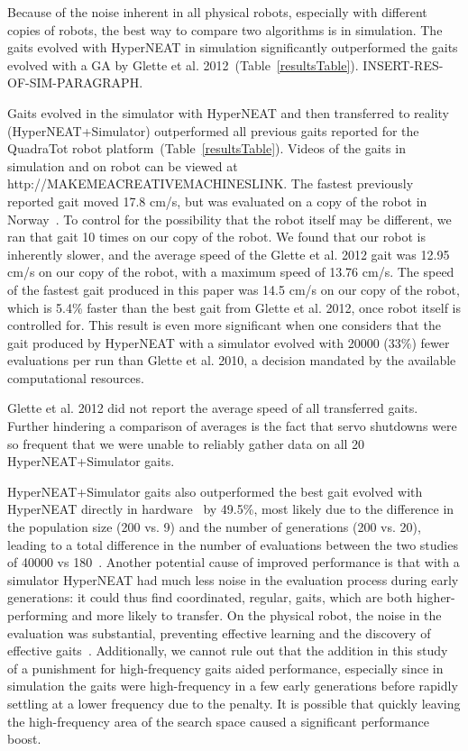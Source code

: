 Because of the noise inherent in all physical robots, especially with different copies of robots, the best way to compare two algorithms is in simulation. The gaits evolved with HyperNEAT in simulation significantly outperformed the gaits evolved with a GA by Glette et al. 2012~(Table~\ref{resultsTable}). INSERT-RES-OF-SIM-PARAGRAPH. 

Gaits evolved in the simulator with HyperNEAT and then transferred to reality (HyperNEAT+Simulator) outperformed all previous gaits reported for the QuadraTot robot platform~(Table~\ref{resultsTable}). Videos of the gaits in simulation and on robot can be viewed at http://MAKEMEACREATIVEMACHINESLINK.
The fastest previously reported gait moved 17.8 cm/s, but was evaluated on a copy of the robot in Norway~\cite{glette}. To control for the possibility that the robot itself may be different, we ran that gait 10 times on our copy of the robot. We found that our robot is inherently slower, and the average speed of the Glette et al. 2012 gait was 12.95 cm/s on our copy of the robot, with a maximum speed of 13.76 cm/s.
The speed of the fastest gait produced in this paper was 14.5 cm/s on our copy of the robot, which is 5.4\% faster than the best gait from Glette et al. 2012, once robot itself is controlled for. This result is even more significant when one considers that the gait produced by HyperNEAT with a simulator evolved with 20000 (33\%) fewer evaluations per run than Glette et al. 2010, a decision mandated by the available computational resources.   

Glette et al. 2012 did not report the average speed of all transferred gaits. Further hindering a comparison of averages is the fact that servo shutdowns were so frequent that we were unable to reliably gather data on all 20 HyperNEAT+Simulator gaits. 


HyperNEAT+Simulator gaits also outperformed the best gait evolved with HyperNEAT directly in hardware~\cite{yos:clune} by 49.5\%, most likely due to the difference in the population size (200 vs. 9) and the number of generations (200 vs. 20), leading to a total difference in the number of evaluations between the two studies of 40000 vs 180~\cite{yos:clune}. Another potential cause of improved performance is that with a simulator HyperNEAT had much less noise in the evaluation process during early generations: it could thus find coordinated, regular, gaits, which are both higher-performing and more likely to transfer. On the physical robot, the noise in the evaluation was substantial, preventing effective learning and the discovery of effective gaits~\cite{yos:clune}. Additionally, we cannot rule out that the addition in this study of a punishment for high-frequency gaits aided performance, especially since in simulation the gaits were high-frequency in a few early generations before rapidly settling at a lower frequency due to the penalty. It is possible that quickly leaving the high-frequency area of the search space caused a significant performance boost. 

